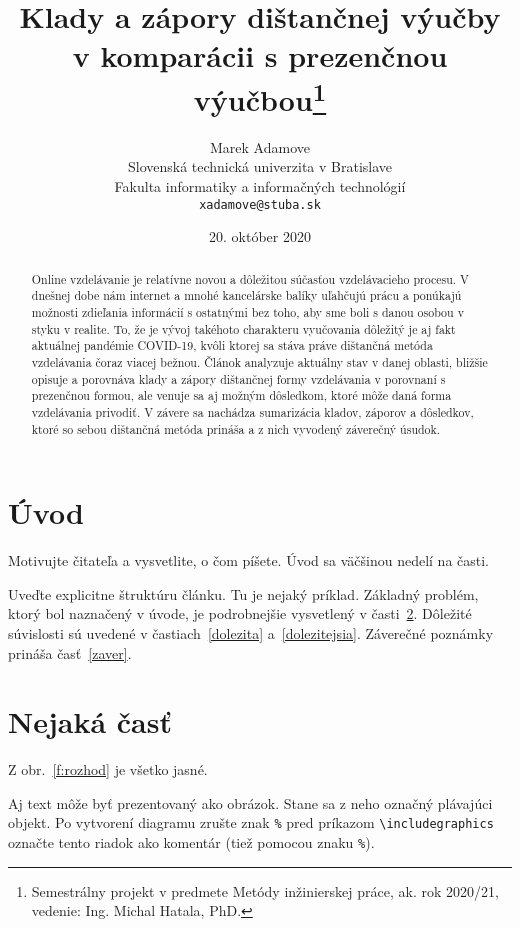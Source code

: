 \documentclass[10pt,twoside,slovak,a4paper]{article}
\title{Klady a zápory dištančnej výučby v komparácii s prezenčnou výučbou\thanks{Semestrálny projekt v predmete Metódy inžinierskej práce, ak. rok 2020/21, vedenie: Ing. Michal Hatala, PhD.}}
\author{Marek Adamove\\[2pt]
	{\small Slovenská technická univerzita v Bratislave}\\
	{\small Fakulta informatiky a informačných technológií}\\
	{\small \texttt{xadamove@stuba.sk}}
	}
\date{\small 20. október 2020}
\begin{document}
\maketitle

\begin{abstract}
Online vzdelávanie je relatívne novou a dôležitou súčasťou vzdelávacieho procesu. V dnešnej
dobe nám internet a mnohé kancelárske balíky uľahčujú prácu a ponúkajú možnosti zdieľania informácií
s ostatnými bez toho, aby sme boli s danou osobou v styku v realite. To, že je vývoj takéhoto charakteru vyučovania dôležitý je aj fakt aktuálnej pandémie COVID-19, kvôli ktorej sa stáva práve dištančná metóda vzdelávania čoraz viacej bežnou. Článok analyzuje aktuálny stav v danej oblasti, bližšie opisuje a porovnáva klady a zápory dištančnej formy vzdelávania v porovnaní s prezenčnou formou, ale venuje sa aj možným dôsledkom, ktoré môže daná forma vzdelávania privodiť. V závere sa nachádza sumarizácia kladov, záporov a dôsledkov, ktoré so sebou dištančná metóda prináša a z nich vyvodený záverečný úsudok.
\end{abstract}



\section{Úvod}

Motivujte čitateľa a vysvetlite, o čom píšete. Úvod sa väčšinou nedelí na časti.

Uveďte explicitne štruktúru článku. Tu je nejaký príklad.
Základný problém, ktorý bol naznačený v úvode, je podrobnejšie vysvetlený v časti~\ref{nejaka}.
Dôležité súvislosti sú uvedené v častiach~\ref{dolezita} a~\ref{dolezitejsia}.
Záverečné poznámky prináša časť~\ref{zaver}.



\section{Nejaká časť} \label{nejaka}

Z obr.~\ref{f:rozhod} je všetko jasné. 

\begin{figure*}[tbh]
\centering
Aj text môže byť prezentovaný ako obrázok. Stane sa z neho označný plávajúci objekt. Po vytvorení diagramu zrušte znak \texttt{\%} pred príkazom \verb|\includegraphics| označte tento riadok ako komentár (tiež pomocou znaku \texttt{\%}).
\caption{Rozhodujúci argument.}
\label{f:rozhod}
\end{figure*}
\end{document}
